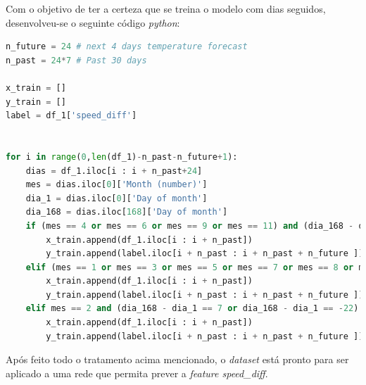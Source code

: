 \documentclass[a4paper, 12pt]{article}
\begin{document}
Com o objetivo de ter a certeza que se treina o modelo com dias seguidos, desenvolveu-se o seguinte código \textit{python}:

\begin{lstlisting}[language=Python]
n_future = 24 # next 4 days temperature forecast
n_past = 24*7 # Past 30 days

x_train = []
y_train = []
label = df_1['speed_diff']


for i in range(0,len(df_1)-n_past-n_future+1):
	dias = df_1.iloc[i : i + n_past+24]
	mes = dias.iloc[0]['Month (number)']
	dia_1 = dias.iloc[0]['Day of month']
	dia_168 = dias.iloc[168]['Day of month']
	if (mes == 4 or mes == 6 or mes == 9 or mes == 11) and (dia_168 - dia_1 == 7 or dia_168 - dia_1 == -25):
		x_train.append(df_1.iloc[i : i + n_past])
		y_train.append(label.iloc[i + n_past : i + n_past + n_future ])
	elif (mes == 1 or mes == 3 or mes == 5 or mes == 7 or mes == 8 or mes == 10 or mes == 12) and (dia_168 - dia_1 == 7 or dia_168 - dia_1 == -24):
		x_train.append(df_1.iloc[i : i + n_past])
		y_train.append(label.iloc[i + n_past : i + n_past + n_future ])
	elif mes == 2 and (dia_168 - dia_1 == 7 or dia_168 - dia_1 == -22):
		x_train.append(df_1.iloc[i : i + n_past])
		y_train.append(label.iloc[i + n_past : i + n_past + n_future ])
\end{lstlisting}

Após feito todo o tratamento acima mencionado, o \textit{dataset} está pronto para ser aplicado a uma rede que permita prever a \textit{feature speed\_diff}.
\end{document}
